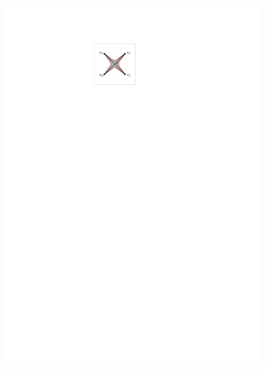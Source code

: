 \begin{figure}[htb]
    \centering
    \begin{minipage}[b]{.24\textwidth}
        \centering
        \includegraphics[width=\textwidth,page=1]{images/2planar_one_crossing}
        \subcaption{~}\label{fig:2_planar_one_crossing_before}
    \end{minipage}
    \begin{minipage}[b]{.24\textwidth}
        \centering

\end{minipage}
\end{figure}
